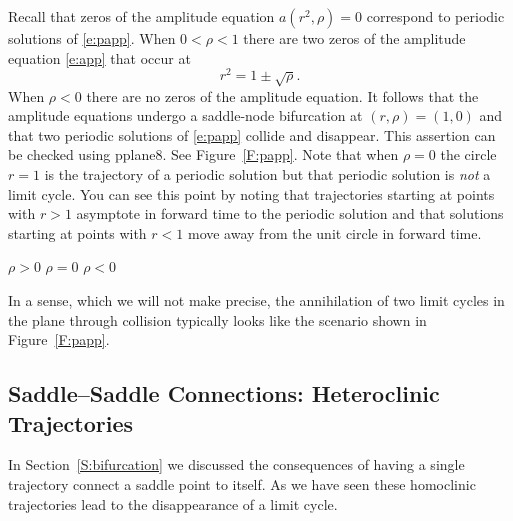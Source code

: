 \documentclass{ximera}
\begin{document}
Recall that zeros of the amplitude equation $a(r^2,\rho)=0$ correspond to 
periodic solutions of \eqref{e:papp}.  When $0<\rho<1$ there are two zeros of 
the amplitude equation \eqref{e:app} that occur at 
\[
r^2 = 1 \pm\sqrt{\rho}.
\]
When $\rho<0$ there are no zeros of the amplitude equation.  
It follows that the amplitude equations undergo a saddle-node 
bifurcation at $(r,\rho)=(1,0)$ and that two periodic solutions of 
\eqref{e:papp} collide and disappear.  This assertion can be 
checked using {\sf pplane8}.  
See Figure~\ref{F:papp}. Note that when $\rho=0$
the circle $r=1$ is the trajectory of a periodic solution but that periodic 
solution is {\em not\/} a limit cycle.  You can see this point by noting that 
trajectories starting at points with $r>1$ asymptote in forward time to the 
periodic solution and that solutions starting at points with $r<1$ move away 
from the unit circle in forward time.  

\begin{figure*}[htb]
           \centerline{%
	   }
 	\vspace*{-0.2in}
	\hspace{0.3in} $\rho>0$  \hspace{1.9in} $\rho=0$
		\hspace{1.9in} $\rho<0$ 
           \caption{Phase portraits for \protect\eqref{e:papp}. 
Note that there are two limit cycles when $\rho>0$; one periodic solution 
when  $\rho=0$; and no periodic solutions when $\rho<0$.}
           \label{F:papp}
\end{figure*}

In a sense, which we will not make precise, the annihilation of two
limit cycles in the plane through collision typically looks like the 
scenario shown in Figure~\ref{F:papp}.  



\subsection*{Saddle--Saddle Connections: Heteroclinic Trajectories}

In Section~\ref{S:bifurcation} we discussed the consequences of having a 
single trajectory connect a saddle point to itself.  As we have seen these 
homoclinic trajectories lead to the disappearance of a limit cycle.
\end{document}
